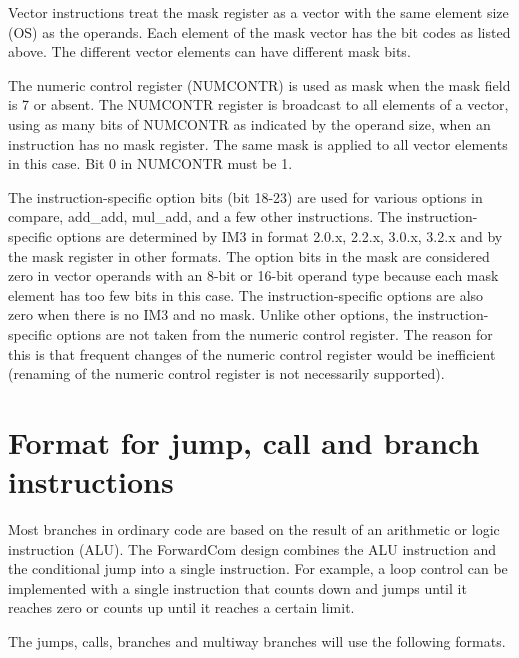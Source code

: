 \documentclass[forwardcom.tex]{subfiles}
\begin{document}
Vector instructions treat the mask register as a vector with the same element size (OS) as the operands. Each element of the mask vector has the bit codes as listed above. The different vector elements can have different mask bits.
\vspace{2mm}

The numeric control register (NUMCONTR) is used as mask when the mask field is 7 or absent. The NUMCONTR register is broadcast to all elements of a vector, using as many bits of NUMCONTR as indicated by the operand size, when an instruction has no mask register. 
The same mask is applied to all vector elements in this case. 
Bit 0 in NUMCONTR must be 1.
\vspace{2mm}

The instruction-specific option bits (bit 18-23) are used for various options in compare, add\_add, mul\_add, and a few other instructions. The instruction-specific options are determined by IM3 in format 2.0.x, 2.2.x, 3.0.x, 3.2.x and by the mask register in other formats. The option bits in the mask are considered zero in vector operands with an 8-bit or 16-bit operand type because each mask element has too few bits in this case. The instruction-specific options are also zero when there is no IM3 and no mask. Unlike other options, the instruction-specific options are not taken from the numeric control register. The reason for this is that frequent changes of the numeric control register would be inefficient (renaming of the numeric control register is not necessarily supported).


\section{Format for jump, call and branch instructions}
Most branches in ordinary code are based on the result of an arithmetic or logic instruction (ALU). The ForwardCom design combines the ALU instruction and the conditional jump into a single instruction. For example, a loop control can be implemented with a single instruction that counts down and jumps until it reaches zero or counts up until it reaches a certain limit.
\vspace{2mm}

The jumps, calls, branches and multiway branches will use the following formats.
\end{document}
